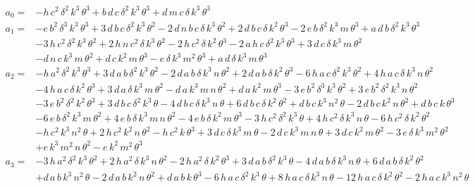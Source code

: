 \documentclass{article}
\begin{document}
\begin{align*}
    a_{0}=&-h\,c^2\,\delta ^2\,k^3\,\theta ^3+b\,d\,c\,\delta ^2\,k^3\,\theta ^3+d\,m\,c\,\delta \,k^3\,\theta ^3\\
    a_{1}=&-e\,b^2\,\delta ^3\,k^3\,\theta ^3+3\,d\,b\,c\,\delta ^2\,k^3\,\theta ^2-2\,d\,n\,b\,c\,\delta \,k^3\,\theta ^2+2\,d\,b\,c\,\delta \,k^2\,\theta ^3-2\,e\,b\,\delta ^2\,k^3\,m\,\theta ^3+a\,d\,b\,\delta ^2\,k^3\,\theta ^3\\
    &-3\,h\,c^2\,\delta ^2\,k^3\,\theta ^2+2\,h\,n\,c^2\,\delta \,k^3\,\theta ^2-2\,h\,c^2\,\delta \,k^2\,\theta ^3-2\,a\,h\,c\,\delta ^2\,k^3\,\theta ^3+3\,d\,c\,\delta \,k^3\,m\,\theta ^2\\
    &-d\,n\,c\,k^3\,m\,\theta ^2+d\,c\,k^2\,m\,\theta ^3-e\,\delta \,k^3\,m^2\,\theta ^3+a\,d\,\delta \,k^3\,m\,\theta ^3\\
    a_{2}=&-h\,a^2\,\delta ^2\,k^3\,\theta ^3+3\,d\,a\,b\,\delta ^2\,k^3\,\theta ^2-2\,d\,a\,b\,\delta \,k^3\,n\,\theta ^2+2\,d\,a\,b\,\delta \,k^2\,\theta ^3-6\,h\,a\,c\,\delta ^2\,k^3\,\theta ^2+4\,h\,a\,c\,\delta \,k^3\,n\,\theta ^2\\
    &-4\,h\,a\,c\,\delta \,k^2\,\theta ^3+3\,d\,a\,\delta \,k^3\,m\,\theta ^2-d\,a\,k^3\,m\,n\,\theta ^2+d\,a\,k^2\,m\,\theta ^3-3\,e\,b^2\,\delta ^3\,k^3\,\theta ^2+3\,e\,b^2\,\delta ^2\,k^3\,n\,\theta ^2\\
    &-3\,e\,b^2\,\delta ^2\,k^2\,\theta ^3+3\,d\,b\,c\,\delta ^2\,k^3\,\theta -4\,d\,b\,c\,\delta \,k^3\,n\,\theta +6\,d\,b\,c\,\delta \,k^2\,\theta ^2+d\,b\,c\,k^3\,n^2\,\theta -2\,d\,b\,c\,k^2\,n\,\theta ^2+d\,b\,c\,k\,\theta ^3\\
    &-6\,e\,b\,\delta ^2\,k^3\,m\,\theta ^2+4\,e\,b\,\delta \,k^3\,m\,n\,\theta ^2-4\,e\,b\,\delta \,k^2\,m\,\theta ^3-3\,h\,c^2\,\delta ^2\,k^3\,\theta +4\,h\,c^2\,\delta \,k^3\,n\,\theta -6\,h\,c^2\,\delta \,k^2\,\theta ^2\\
    &-h\,c^2\,k^3\,n^2\,\theta +2\,h\,c^2\,k^2\,n\,\theta ^2-h\,c^2\,k\,\theta ^3+3\,d\,c\,\delta \,k^3\,m\,\theta -2\,d\,c\,k^3\,m\,n\,\theta +3\,d\,c\,k^2\,m\,\theta ^2-3\,e\,\delta \,k^3\,m^2\,\theta ^2\\
    &+e\,k^3\,m^2\,n\,\theta ^2-e\,k^2\,m^2\,\theta ^3\\
    a_{3}=&-3\,h\,a^2\,\delta ^2\,k^3\,\theta ^2+2\,h\,a^2\,\delta \,k^3\,n\,\theta ^2-2\,h\,a^2\,\delta \,k^2\,\theta ^3+3\,d\,a\,b\,\delta ^2\,k^3\,\theta -4\,d\,a\,b\,\delta \,k^3\,n\,\theta +6\,d\,a\,b\,\delta \,k^2\,\theta ^2\\
    &+d\,a\,b\,k^3\,n^2\,\theta -2\,d\,a\,b\,k^2\,n\,\theta ^2+d\,a\,b\,k\,\theta ^3-6\,h\,a\,c\,\delta ^2\,k^3\,\theta +8\,h\,a\,c\,\delta \,k^3\,n\,\theta -12\,h\,a\,c\,\delta \,k^2\,\theta ^2-2\,h\,a\,c\,k^3\,n^2\,\theta \\

\end{align*}
\end{document}
